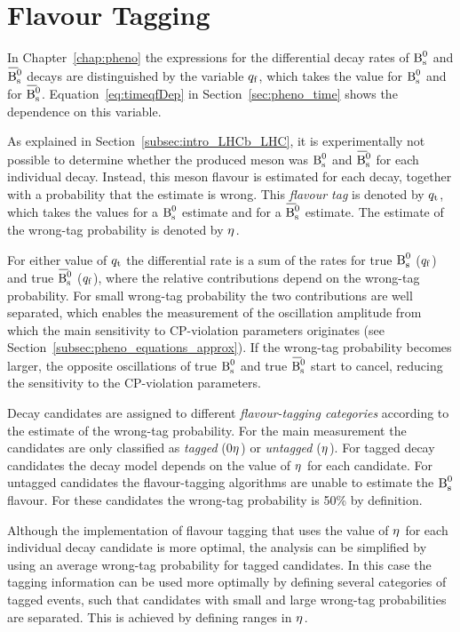 \section{Flavour Tagging}
\label{sec:ana_tagging}

In Chapter~\ref{chap:pheno} the expressions for the differential decay rates of $\text{B}_\text{s}^\text{0}$ and $\Bsbar$ decays are distinguished by the
variable ${q_\mathrm{f}}$, which takes the value  for $\text{B}_\text{s}^\text{0}$ and  for $\Bsbar$. Equation~\ref{eq:timeqfDep} in Section~\ref{sec:pheno_time}
shows the dependence on this variable.

As explained in Section~\ref{subsec:intro_LHCb_LHC}, it is experimentally not possible to determine whether the produced meson was $\text{B}_\text{s}^\text{0}$
and $\Bsbar$ for each individual decay. Instead, this meson flavour is estimated for each decay, together with a probability that the
estimate is wrong. This \emph{flavour tag} is denoted by $q_\mathrm{t}$, which takes the values  for a $\text{B}_\text{s}^\text{0}$ estimate and  for a $\Bsbar$
estimate. The estimate of the wrong-tag probability is denoted by $\eta^{}$.

For either value of $q_\mathrm{t}$ the differential rate is a sum of the rates for true $\text{B}_\text{s}^\text{0}$ (${q_\mathrm{f}}$\texteq{}) and true $\Bsbar$
(${q_\mathrm{f}}$\texteq{}), where the relative contributions depend on the wrong-tag probability. For small wrong-tag probability the two
contributions are well separated, which enables the measurement of the oscillation amplitude from which the main sensitivity to
CP-violation parameters originates (see Section~\ref{subsec:pheno_equations_approx}). If the wrong-tag probability becomes larger, the
opposite oscillations of true $\text{B}_\text{s}^\text{0}$ and true $\Bsbar$ start to cancel, reducing the sensitivity to the CP-violation parameters.

Decay candidates are assigned to different \emph{flavour-tagging categories} according to the estimate of the wrong-tag probability. For
the main measurement the candidates are only classified as \emph{tagged} (0\textlt$\eta^{}$) or \emph{untagged}
($\eta^{}$). For tagged decay candidates the decay model depends on the value of $\eta^{}$ for each candidate. For untagged
candidates the flavour-tagging algorithms are unable to estimate the $\text{B}_\text{s}^\text{0}$ flavour. For these candidates the wrong-tag probability is 50\%
by definition.

Although the implementation of flavour tagging that uses the value of $\eta^{}$ for each individual decay candidate is more optimal, the
analysis can be simplified by using an average wrong-tag probability for tagged candidates. In this case the tagging information can be
used more optimally by defining several categories of tagged events, such that candidates with small and large wrong-tag probabilities are
separated. This is achieved by defining ranges in $\eta^{}$.

